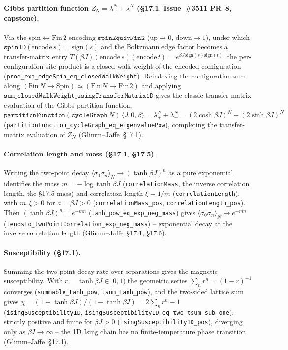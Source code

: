 \documentclass[a4paper,11pt]{article}
\begin{document}
\paragraph{Gibbs partition function $Z_N = \lambda_+^N + \lambda_-^N$ (\S17.1, Issue~\#3511 PR~8, capstone).}
Via the spin$\leftrightarrow\mathrm{Fin}\,2$ encoding $\texttt{spinEquivFin2}$
($\mathrm{up}\mapsto 0$, $\mathrm{down}\mapsto 1$), under which
$\texttt{spin1D}(\mathrm{encode}\,s) = \mathrm{sign}(s)$ and the Boltzmann edge
factor becomes a transfer-matrix entry
$T(\beta J)(\mathrm{encode}\,s)(\mathrm{encode}\,t) = e^{\beta J\,\mathrm{sign}(s)\mathrm{sign}(t)}$,
the per-configuration site product is a closed-walk weight of the encoded
configuration (\texttt{prod\_exp\_edgeSpin\_eq\_closedWalkWeight}). Reindexing the
configuration sum along $(\mathrm{Fin}\,N \to \mathrm{Spin}) \simeq (\mathrm{Fin}\,N \to \mathrm{Fin}\,2)$
and applying $\texttt{sum\_closedWalkWeight\_isingTransferMatrix1D}$ gives the
classic transfer-matrix evaluation of the Gibbs partition function,
$\texttt{partitionFunction}(\texttt{cycleGraph}\,N)\,\langle J,0,\beta\rangle = \lambda_+^N + \lambda_-^N = (2\cosh\beta J)^N + (2\sinh\beta J)^N$
(\texttt{partitionFunction\_cycleGraph\_eq\_eigenvaluePow}), completing the
transfer-matrix evaluation of $Z_N$ (Glimm--Jaffe~\S17.1).

\paragraph{Correlation length and mass (\S17.1, \S17.5).}
Writing the two-point decay $\langle\sigma_0\sigma_n\rangle_N \to (\tanh\beta J)^n$
as a pure exponential identifies the mass $m = -\log\tanh\beta J$
(\texttt{correlationMass}, the inverse correlation length, the \S17.5 mass) and
correlation length $\xi = 1/m$ (\texttt{correlationLength}), with $m, \xi > 0$ for
$a = \beta J > 0$ (\texttt{correlationMass\_pos}, \texttt{correlationLength\_pos}).
Then $(\tanh\beta J)^n = e^{-m n}$ (\texttt{tanh\_pow\_eq\_exp\_neg\_mass}) gives
$\langle\sigma_0\sigma_n\rangle_N \to e^{-m n}$
(\texttt{tendsto\_twoPointCorrelation\_exp\_neg\_mass}) -- exponential decay at the
inverse correlation length (Glimm--Jaffe~\S17.1, \S17.5).

\paragraph{Susceptibility (\S17.1).}
Summing the two-point decay rate over separations gives the magnetic
susceptibility. With $r = \tanh\beta J \in [0,1)$ the geometric series
$\sum_n r^n = (1-r)^{-1}$ converges (\texttt{summable\_tanh\_pow},
\texttt{tsum\_tanh\_pow}), and the two-sided lattice sum gives
$\chi = (1+\tanh\beta J)/(1-\tanh\beta J) = 2\sum_n r^n - 1$
(\texttt{isingSusceptibility1D}, \texttt{isingSusceptibility1D\_eq\_two\_tsum\_sub\_one}),
strictly positive and finite for $\beta J > 0$ (\texttt{isingSusceptibility1D\_pos}),
diverging only as $\beta J \to \infty$ -- the 1D Ising chain has no
finite-temperature phase transition (Glimm--Jaffe~\S17.1).
\end{document}
